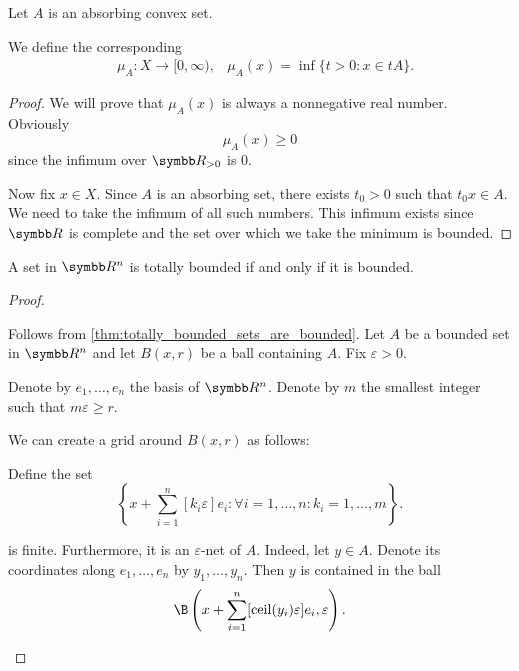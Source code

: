 \begin{definition}\label{def:minkowski_functional}
  Let \( A \) is an absorbing convex set.

  We define the corresponding 
  \begin{align*}
    &\mu_A: X \to [0, \infty),
    &\mu_A(x) = \inf \{ t > 0 \colon x \in tA \}.
  \end{align*}
\end{definition}
\begin{proof}
  We will prove that \( \mu_A(x) \) is always a nonnegative real number. Obviously
  \begin{equation*}
    \mu_A(x) \geq 0
  \end{equation*}
  since the infimum over \( \R_{>0} \) is \( 0 \).

  Now fix \( x \in X \). Since \( A \) is an absorbing set, there exists \( t_0 > 0 \) such that \( t_0 x \in A \). We need to take the infimum of all such numbers. This infimum exists since \( \R \) is complete and the set over which we take the minimum is bounded.
\end{proof}

\begin{proposition}\label{thm:rn_bounded_iff_totally_bounded}
  A set in \( \R^n \) is totally bounded if and only if it is bounded.
\end{proposition}
\begin{proof}
  \begin{description}
    \Implies Follows from \cref{thm:totally_bounded_sets_are_bounded}.
    \ImpliedBy Let \( A \) be a bounded set in \( \R^n \) and let \( B(x, r) \) be a ball containing \( A \). Fix \( \varepsilon > 0 \).

    Denote by \( e_1, \ldots, e_n \) the basis of \( \R^n \). Denote by \( m \) the smallest integer such that \( m \varepsilon \geq r \).

    We can create a grid around \( B(x, r) \) as follows:

    Define the set
    \begin{equation*}
      \left\{ x + \sum_{i=1}^n [k_i \varepsilon] e_i \colon \forall i = 1, \ldots, n: k_i = 1, \ldots, m \right\}.
    \end{equation*}

    is finite. Furthermore, it is an \( \varepsilon \)-net of \( A \). Indeed, let \( y \in A \). Denote its coordinates along \( e_1, \ldots, e_n \) by \( y_1, \ldots, y_n \). Then \( y \) is contained in the ball
    \begin{equation*}
      \B\left(x + \sum_{i=1}^n [\Ceil(y_i) \varepsilon] e_i, \varepsilon \right).
    \end{equation*}
  \end{description}
\end{proof}

